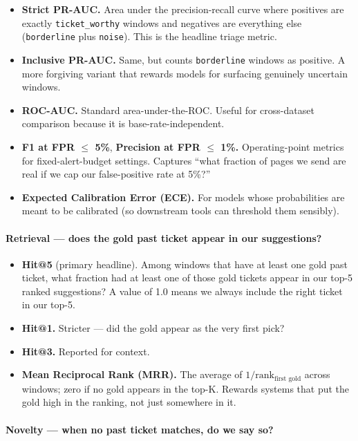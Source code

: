 \begin{itemize}
\item \textbf{Strict PR-AUC.} Area under the precision-recall curve where positives are exactly \texttt{ticket\_worthy} windows and negatives are everything else (\texttt{borderline} plus \texttt{noise}). This is the headline triage metric.
\item \textbf{Inclusive PR-AUC.} Same, but counts \texttt{borderline} windows as positive. A more forgiving variant that rewards models for surfacing genuinely uncertain windows.
\item \textbf{ROC-AUC.} Standard area-under-the-ROC. Useful for cross-dataset comparison because it is base-rate-independent.
\item \textbf{F1 at FPR $\leq$ 5\%}, \textbf{Precision at FPR $\leq$ 1\%.} Operating-point metrics for fixed-alert-budget settings. Captures ``what fraction of pages we send are real if we cap our false-positive rate at 5\%?''
\item \textbf{Expected Calibration Error (ECE).} For models whose probabilities are meant to be calibrated (so downstream tools can threshold them sensibly).
\end{itemize}

\paragraph{Retrieval --- does the gold past ticket appear in our suggestions?}

\begin{itemize}
\item \textbf{Hit@5} (primary headline). Among windows that have at least one gold past ticket, what fraction had at least one of those gold tickets appear in our top-5 ranked suggestions? A value of 1.0 means we always include the right ticket in our top-5.
\item \textbf{Hit@1.} Stricter --- did the gold appear as the very first pick?
\item \textbf{Hit@3.} Reported for context.
\item \textbf{Mean Reciprocal Rank (MRR).} The average of $1 / \text{rank}_{\text{first gold}}$ across windows; zero if no gold appears in the top-K. Rewards systems that put the gold high in the ranking, not just somewhere in it.
\end{itemize}

\paragraph{Novelty --- when no past ticket matches, do we say so?}

